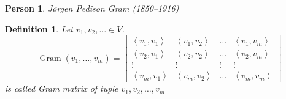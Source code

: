 \documentclass[a4paper]{article}
\newcounter{lecref}[section]
\numberwithin{lecref}{section}
\newtheorem{definition}[lecref]{Definition}
\newtheorem*{Person}{Person}
\newcommand{\ip}[2]{\left\langle#1,#2\right\rangle} %
\begin{document}
\begin{Person}
  J{\o}rgen Pedison Gram (1850--1916)
\end{Person}

\begin{definition} %
  Let $v_1, v_2, \ldots \in V$.
  \[
    \operatorname{Gram}(v_1, \ldots, v_m) = \begin{bmatrix}
      \ip{v_1}{v_1} & \ip{v_1}{v_2} & \ldots & \ip{v_1}{v_m} \\ 
      \ip{v_2}{v_1} & \ip{v_2}{v_2} & \ldots & \ip{v_2}{v_m} \\ 
      \vdots & \vdots & \vdots & \vdots \\
      \ip{v_m}{v_1} & \ip{v_m}{v_2} & \ldots & \ip{v_m}{v_m}
    \end{bmatrix}
  \]
  is called \emph{Gram matrix of tuple $v_1, v_2, \ldots, v_m$}
\end{definition}
\end{document}
